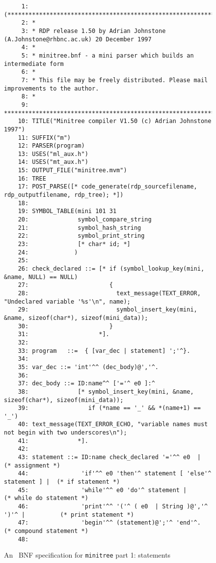 \begin{figure}
\hspace*{-2cm}
\begin{minipage}{30cm}
\footnotesize
\begin{verbatim}
     1: (*******************************************************************************
     2: *
     3: * RDP release 1.50 by Adrian Johnstone (A.Johnstone@rhbnc.ac.uk) 20 December 1997
     4: *
     5: * minitree.bnf - a mini parser which builds an intermediate form
     6: *
     7: * This file may be freely distributed. Please mail improvements to the author.
     8: *
     9: *******************************************************************************)
    10: TITLE("Minitree compiler V1.50 (c) Adrian Johnstone 1997")
    11: SUFFIX("m")
    12: PARSER(program)
    13: USES("ml_aux.h")
    14: USES("mt_aux.h")
    15: OUTPUT_FILE("minitree.mvm")
    16: TREE
    17: POST_PARSE([* code_generate(rdp_sourcefilename, rdp_outputfilename, rdp_tree); *])
    18: 
    19: SYMBOL_TABLE(mini 101 31
    20:              symbol_compare_string
    21:              symbol_hash_string
    22:              symbol_print_string
    23:              [* char* id; *]
    24:             )
    25: 
    26: check_declared ::= [* if (symbol_lookup_key(mini, &name, NULL) == NULL)
    27:                       {
    28:                         text_message(TEXT_ERROR, "Undeclared variable '%s'\n", name);
    29:                         symbol_insert_key(mini, &name, sizeof(char*), sizeof(mini_data));
    30:                       }
    31:                    *].
    32: 
    33: program   ::=  { [var_dec | statement] ';'^}.
    34: 
    35: var_dec ::= 'int'^^ (dec_body)@','^.
    36: 
    37: dec_body ::= ID:name^^ ['='^ e0 ]:^
    38:              [* symbol_insert_key(mini, &name, sizeof(char*), sizeof(mini_data)); 
    39:                 if (*name == '_' && *(name+1) == '_')
    40: text_message(TEXT_ERROR_ECHO, "variable names must not begin with two underscores\n");
    41:              *].
    42: 
    43: statement ::= ID:name check_declared '='^^ e0  |                   (* assignment *)
    44:               'if'^^ e0 'then'^ statement [ 'else'^ statement ] |  (* if statement *)
    45:               'while'^^ e0 'do'^ statement |                       (* while do statement *)
    46:               'print'^^ '('^ ( e0  | String )@','^ ')'^ |          (* print statement *)
    47:               'begin'^^ (statement)@';'^ 'end'^.                   (* compound statement *)
    48: 
\end{verbatim}
\end{minipage}
\caption{An \rdp\ BNF specification for {\tt minitree} part 1: statements}
\label{minitree.bnf:1}
\end{figure}
